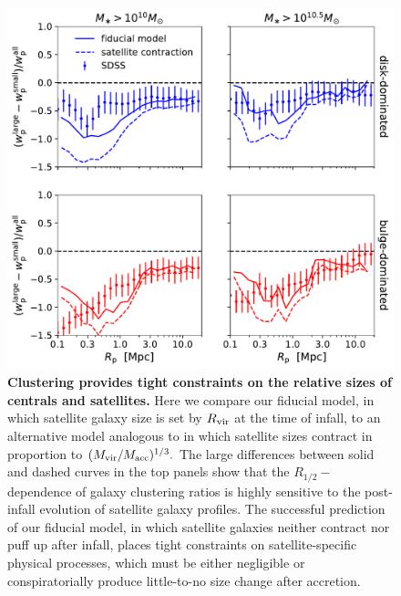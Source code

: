 \documentclass[usenatbib,usegraphicx,letterpaper]{mn2e}
\newcommand{\rhalf}{R_{1/2}}
\newcommand{\rvir}{R_{\rm vir}}
\newcommand{\mvir}{M_{\rm vir}}
\newcommand{\macc}{M_{\rm acc}}
\begin{document}
\begin{figure}
\centering
\includegraphics[width=12cm]{FIGS/alternate_satellite_models_size_clustering_ratios.pdf}
\caption{
{\bf Clustering provides tight constraints on the relative sizes of centrals and satellites.} 
Here we compare our fiducial model, in which satellite galaxy size is set by $\rvir$ at the time of infall, to an alternative model analogous to \citet{watson_etal12} in which satellite sizes contract in proportion to $(\mvir/\macc)^{1/3}.$ The large differences between solid and dashed curves in the top panels show that the $\rhalf-$dependence of galaxy clustering ratios is highly sensitive to the post-infall evolution of satellite galaxy profiles. The successful prediction of our fiducial model, in which satellite galaxies neither contract nor puff up after infall, places tight constraints on satellite-specific physical processes, which must be either negligible or conspiratorially produce little-to-no size change after accretion. 
}
\label{fig:satellites}
\end{figure}
\end{document}
